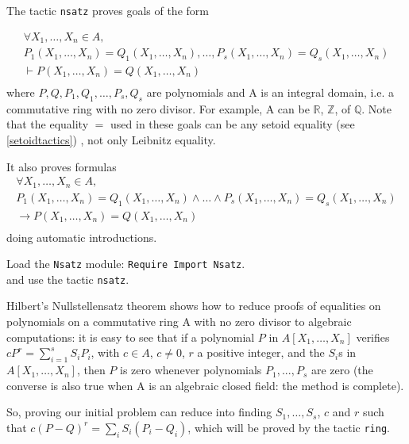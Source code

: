 
The tactic \texttt{nsatz} proves goals of the form

\[ \begin{array}{l}
  \forall X_1,\ldots,X_n \in A,\\
   P_1(X_1,\ldots,X_n) = Q_1(X_1,\ldots,X_n) , \ldots ,  P_s(X_1,\ldots,X_n) =Q_s(X_1,\ldots,X_n)\\ 
 \vdash P(X_1,\ldots,X_n) = Q(X_1,\ldots,X_n)\\
  \end{array}
\]
where $P,Q, P_1,Q_1,\ldots,P_s,Q_s$ are polynomials and A is an integral
domain, i.e. a commutative ring with no zero divisor. For example, A can be
$\mathbb{R}$, $\mathbb{Z}$, of $\mathbb{Q}$. Note that the equality $=$ used in these
goals can be any setoid equality 
(see \ref{setoidtactics})
, not only Leibnitz equality.

It also proves formulas
\[ \begin{array}{l}
  \forall X_1,\ldots,X_n \in A,\\
   P_1(X_1,\ldots,X_n) = Q_1(X_1,\ldots,X_n) \wedge \ldots \wedge  P_s(X_1,\ldots,X_n) =Q_s(X_1,\ldots,X_n)\\ 
 \rightarrow P(X_1,\ldots,X_n) = Q(X_1,\ldots,X_n)\\
  \end{array}
\] doing automatic introductions.
 

Load the
\texttt{Nsatz} module: \texttt{Require Import Nsatz}.\\
 and use the tactic \texttt{nsatz}.


Hilbert's Nullstellensatz theorem shows how to reduce proofs of equalities on
polynomials on a commutative ring A with no zero divisor to algebraic computations: it is easy to see that if a polynomial
$P$ in $A[X_1,\ldots,X_n]$ verifies $c P^r = \sum_{i=1}^{s} S_i P_i$, with $c
\in A$, $c \not = 0$, $r$ a positive integer, and the $S_i$s in
$A[X_1,\ldots,X_n]$, then $P$ is zero whenever polynomials $P_1,...,P_s$  are
zero (the converse is also true when A is an algebraic closed field:
the method is complete). 

So, proving our initial problem can reduce into finding $S_1,\ldots,S_s$, $c$
and $r$ such that $c (P-Q)^r = \sum_{i} S_i (P_i-Q_i)$, which will be proved by the
tactic \texttt{ring}.

